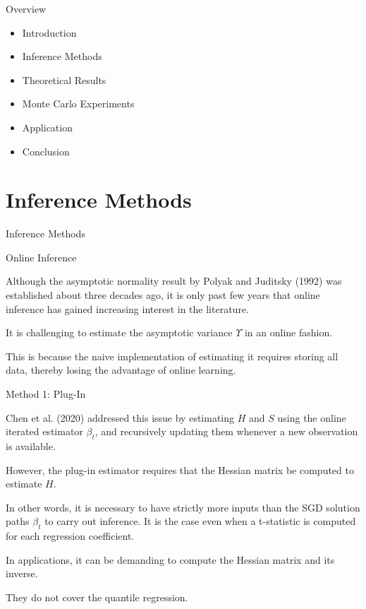 \documentclass[beamer, t]{beamer}
\newcommand{\bit}{\begin{itemize}}
\newcommand{\eit}{\end{itemize}}
\begin{document}
\begin{frame}{Overview}
    \vfill
    \bit
        \item Introduction
        \item Inference Methods
        \item Theoretical Results
        \item Monte Carlo Experiments
        \item Application
        \item Conclusion
    \eit
    \vfill
\end{frame}




\section{Inference Methods}

\begin{frame}
   \vfill
   \centering
   \LARGE{Inference Methods}
   \vfill
\end{frame}

  

\begin{frame}{Online Inference}

Although the asymptotic normality result by Polyak and Juditsky (1992) was established about three decades ago, it is only past few years that online inference has gained increasing interest in the literature.
\bigskip

It is challenging to estimate the asymptotic variance $\Upsilon$  in an online fashion.
\bigskip


This is because
the naive implementation of estimating it requires storing all data, thereby losing the advantage of online learning.


\end{frame}



\begin{frame}{Method 1: Plug-In}


Chen et al. (2020) addressed this issue by  estimating   $H$ and $S$ using the online iterated estimator $\beta_t$, and recursively updating   them   whenever a new observation  is available.

\bigskip 
However, the plug-in estimator requires that the Hessian matrix be computed to estimate $H$.

\bigskip
In other words, it is necessary to have strictly more inputs than  the SGD solution paths $\beta_t$ to carry out inference. It is the case even when a t-statistic is computed for each regression coefficient.

\bigskip
In applications, it can be demanding to compute the Hessian matrix and its inverse. 

\bigskip
They do not cover the quantile regression.

\end{frame}
\end{document}
